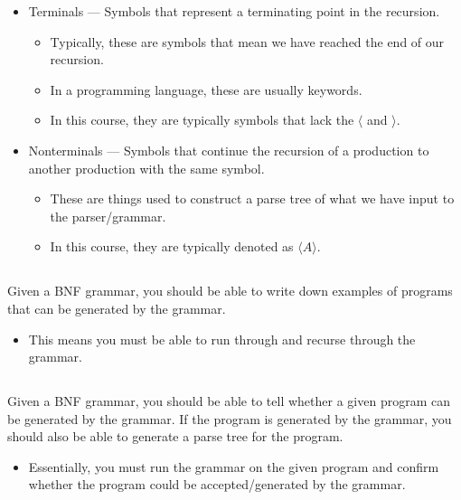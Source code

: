 \begin{itemize}
\item Terminals --- Symbols that represent a terminating point in the recursion.
  \begin{itemize}[noitemsep]
  \item Typically, these are symbols that mean we have reached the end of our recursion.
  \item In a programming language, these are usually keywords.
  \item In this course, they are typically symbols that lack the $\langle$ and $\rangle$.
  \end{itemize}

\item Nonterminals --- Symbols that continue the recursion of a production to another production with the same symbol.
  \begin{itemize}[noitemsep]
  \item These are things used to construct a parse tree of what we have input to the parser/grammar.
  \item In this course, they are typically denoted as $\langle A \rangle$.
  \end{itemize}
\end{itemize}

\subsection{}
Given a BNF grammar, you should be able to write down examples of programs that can be generated by the grammar.

\begin{itemize}[noitemsep]
\item This means you must be able to run through and recurse through the grammar.
\end{itemize}

\subsection{}
Given a BNF grammar, you should be able to tell whether a given program can be generated by the grammar. If the program is generated by the grammar, you should also be able to generate a parse tree for the program.

\begin{itemize}[noitemsep]
\item Essentially, you must run the grammar on the given program and confirm whether the program could be accepted/generated by the grammar.
\end{itemize}

